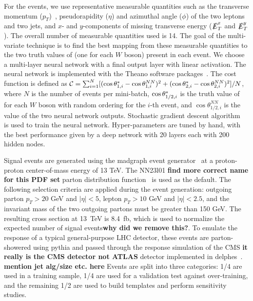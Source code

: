 For the \ssWW events, we use representative measurable quantities such
as the transverse momentum ($p_T$)~\cite{coordinate}, pseudorapidity ($\eta$) and
azimuthal angle ($\phi$) of the two leptons and two jets, and $x$- and $y$-components 
of missing transverse energy ($\slashed{E}_T^x$ and
$\slashed{E}_T^y$).  The overall number of measurable quantities used is 14. 
The goal of the multi-variate technique is to find
the best mapping from these measurable quantities to the two truth
values of \cts (one for each $W$ boson) present in each event.  We
choose a multi-layer neural network with a final output layer with
linear activation. The neural network is implemented with the Theano
software packages~\cite{theano}. The cost function is defined as 
${\cal{C}}= \sum_{i=1}^{N} [(\ctsnb_{1,i} -\cos \theta^{NN}_{1,i})^2+(\ctsnb_{2,i}-\cos \theta^{NN}_{2,i})^2]/N$, 
where $N$ is the number of events per mini-batch,
$ \cos  \theta^{*}  _{1/2,i}$ is the truth value of \cts for each $W$ boson with
random ordering for the $i$-th event, and $\cos \theta^{NN}_{1/2, i}$ is the value of
the two neural network outputs. Stochastic gradient descent
algorithm~\cite{sgd} is used to train the neural network. Hyper-parameters are tuned by hand,
with the best performance given by a deep network with 20 layers each with 200 hidden nodes.  

Signal \ssWW events are generated using the {\sc madgraph} event generator~\cite{madgraph} at a proton-proton center-of-mass energy of 13 TeV.  
The NN23l01 {\bf find more correct name for this PDF set} parton distribution function~\cite{pdf} is used as the default. 
The following selection criteria are applied during the event generation: outgoing parton $p_T > 20$ GeV and $|\eta| < 5$, 
lepton $p_T > 10$ GeV and $|\eta| < 2.5$, and the invariant mass of the two outgoing partons must be greater than 150 GeV. The resulting cross section at 13~TeV is 8.4~fb, which is used to normalize the expected number of signal events{\bf why did we remove this?}.
To emulate the response of a typical general-purpose LHC detector, these events are parton-showered using {\sc pythia}\cite{pythia} and passed through the 
response simulation of the CMS {\bf it really is the CMS detector not ATLAS} detector implemented in {\sc delphes}~\cite{delphes}. {\bf mention jet alg/size etc. here} Events
are split into three categories: 1/4 are used in a training sample,
1/4 are used for a validation test against over-training, and the
remaining 1/2 are used to build templates and perform sensitivity
studies.%

